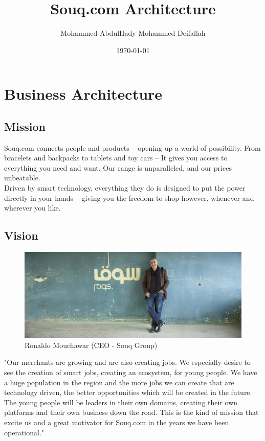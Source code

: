 \documentclass{book}
\begin{document}
\title{Souq.com Architecture}
\date{\today}
\author{Mohammed AbdulHady Mohammed Deifallah}
\maketitle
\newpage

\tableofcontents
\newpage



\chapter{Business Architecture}
\section{Mission}
Souq.com connects people and products – opening up a world of possibility. From bracelets and backpacks to tablets and toy cars – It gives you access to everything you need and want. Our range is unparalleled, and our prices unbeatable.\\
Driven by smart technology, everything they do is designed to put the power directly in your hands – giving you the freedom to shop however, whenever and wherever you like.

\section{Vision}
\begin{figure}[h]
\centering
\includegraphics[scale=0.19]{ceo.jpg}
\caption{Ronaldo Mouchawar (CEO - Souq Group)}
\label{fig_ceo}
\end{figure}

\noindent "Our merchants are growing and are also creating jobs. We especially desire to see the creation of smart jobs, creating an ecosystem, for young people. We have a huge population in the region and the more jobs we can create that are technology driven, the better opportunities which will be created in the future. The young people will be leaders in their own domains, creating their own platforms and their own business down the road. This is the kind of mission that excite us and a great motivator for Souq.com in the years we have been operational."\\\\\\
\end{document}
